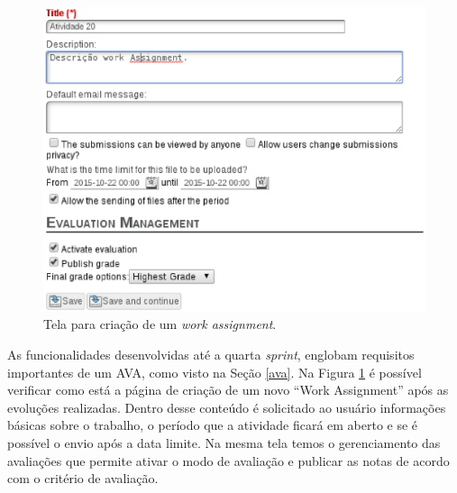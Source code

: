 \begin{figure}[h]
    \centering
    \includegraphics[keepaspectratio=true,scale=0.6]
      {figuras/work-assignment-final.eps}
    \caption{Tela para criação de um \textit{work assignment}.}
    \label{fig:work-assignment-final}
\end{figure}

As funcionalidades desenvolvidas até a quarta \textit{sprint}, englobam requisitos importantes de um AVA, como visto na Seção \ref{ava}. Na Figura \ref{fig:work-assignment-final} é possível verificar como está a página de criação de um novo ``Work Assignment'' após as evoluções realizadas. Dentro desse conteúdo é solicitado ao usuário informações básicas sobre o trabalho, o período que a atividade ficará em aberto e se é possível o envio após a data limite. Na mesma tela temos o gerenciamento das avaliações que permite ativar o modo de avaliação e publicar as notas de acordo com o critério de avaliação.



